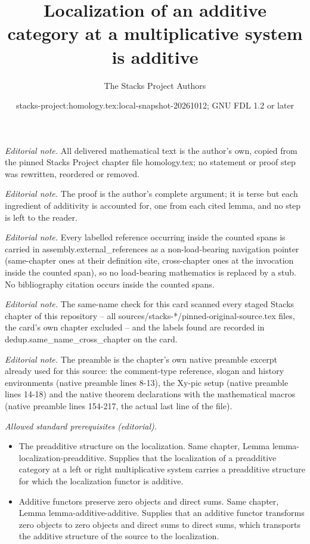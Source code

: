 \documentclass[10pt,a4paper]{amsart}
\title{Localization of an additive category at a multiplicative system is additive}
\author{The Stacks Project Authors}
\date{stacks-project:homology.tex:local-snapshot-20261012; GNU FDL 1.2 or later}
\theoremstyle{plain}
\theoremstyle{definition}
\theoremstyle{remark}
\numberwithin{equation}{subsection}
\begin{document}
\maketitle
\noindent\textit{Editorial note.} All delivered mathematical text is the author's own, copied from the pinned Stacks Project chapter file homology.tex; no statement or proof step was rewritten, reordered or removed.\par\medskip
\noindent\textit{Editorial note.} The proof is the author's complete argument; it is terse but each ingredient of additivity is accounted for, one from each cited lemma, and no step is left to the reader.\par\medskip
\noindent\textit{Editorial note.} Every labelled reference occurring inside the counted spans is carried in assembly.external\_references as a non-load-bearing navigation pointer (same-chapter ones at their definition site, cross-chapter ones at the invocation inside the counted span), so no load-bearing mathematics is replaced by a stub. No bibliography citation occurs inside the counted spans.\par\medskip
\noindent\textit{Editorial note.} The same-name check for this card scanned every staged Stacks chapter of this repository -- all sources/stacks-*/pinned-original-source.tex files, the card's own chapter excluded -- and the labels found are recorded in dedup.same\_name\_cross\_chapter on the card.\par\medskip
\noindent\textit{Editorial note.} The preamble is the chapter's own native preamble excerpt already used for this source: the comment-type reference, slogan and history environments (native preamble lines 8-13), the Xy-pic setup (native preamble lines 14-18) and the native theorem declarations with the mathematical macros (native preamble lines 154-217, the actual last line of the file).\par\medskip
\noindent\textit{Allowed standard prerequisites (editorial).}\begin{itemize}
\item The preadditive structure on the localization. Same chapter, Lemma lemma-localization-preadditive. Supplies that the localization of a preadditive category at a left or right multiplicative system carries a preadditive structure for which the localization functor is additive.
\item Additive functors preserve zero objects and direct sums. Same chapter, Lemma lemma-additive-additive. Supplies that an additive functor transforms zero objects to zero objects and direct sums to direct sums, which transports the additive structure of the source to the localization.
\end{itemize}\medskip
\end{document}
